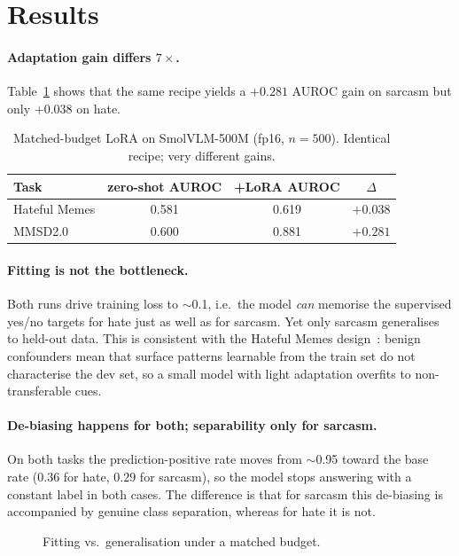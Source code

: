 \documentclass[sigconf,nonacm]{acmart}
\begin{document}
\section{Results}
\paragraph{Adaptation gain differs $7\times$.} Table~\ref{tab:gain} shows that the same
recipe yields a $+0.281$ AUROC gain on sarcasm but only $+0.038$ on hate.

\begin{table}[t]
\centering
\caption{Matched-budget LoRA on SmolVLM-500M (fp16, $n{=}500$). Identical recipe; very
different gains.}
\label{tab:gain}
\begin{tabular}{lccc}
\toprule
Task & zero-shot AUROC & +LoRA AUROC & $\Delta$ \\
\midrule
Hateful Memes & 0.581 & 0.619 & $+0.038$ \\
MMSD2.0       & 0.600 & 0.881 & $+0.281$ \\
\bottomrule
\end{tabular}
\end{table}

\paragraph{Fitting is not the bottleneck.} Both runs drive training loss to $\sim$0.1,
i.e.\ the model \emph{can} memorise the supervised yes/no targets for hate just as well as
for sarcasm. Yet only sarcasm generalises to held-out data. This is consistent with the
Hateful Memes design~\cite{kiela2020hateful}: benign confounders mean that surface
patterns learnable from the train set do not characterise the dev set, so a small model
with light adaptation overfits to non-transferable cues.

\paragraph{De-biasing happens for both; separability only for sarcasm.} On both tasks the
prediction-positive rate moves from $\sim$0.95 toward the base rate ($0.36$ for hate,
$0.29$ for sarcasm), so the model stops answering with a constant label in both cases.
The difference is that for sarcasm this de-biasing is accompanied by genuine class
separation, whereas for hate it is not.

\begin{figure}[t]
\centering
{}
\caption{Fitting vs.\ generalisation under a matched budget.}
\label{fig:loss}
\end{figure}
\end{document}
